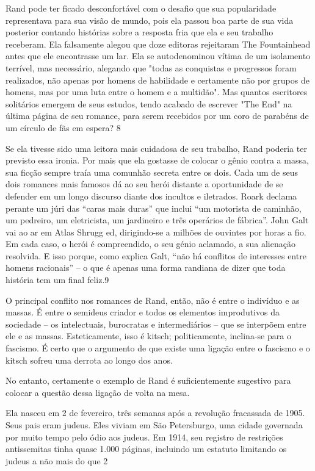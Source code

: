  \par 
Rand pode ter ficado desconfortável com o desafio que sua popularidade representava para sua visão de mundo, pois ela passou boa parte de sua vida posterior contando histórias sobre a resposta fria que ela e seu trabalho receberam. Ela falsamente alegou que doze editoras rejeitaram The Fountainhead antes que ele encontrasse um lar. Ela se autodenominou vítima de um isolamento terrível, mas necessário, alegando que "todas as conquistas e progressos foram realizados, não apenas por homens de habilidade e certamente não por grupos de homens, mas por uma luta entre o homem e a multidão". Mas quantos escritores solitários emergem de seus estudos, tendo acabado de escrever "The End" na última página de seu romance, para serem recebidos por um coro de parabéns de um círculo de fãs em espera? {\color{blue}8}
 \par 
Se ela tivesse sido uma leitora mais cuidadosa de seu trabalho, Rand poderia ter previsto essa ironia. Por mais que ela gostasse de colocar o gênio contra a massa, sua ficção sempre traía uma comunhão secreta entre os dois. Cada um de seus dois romances mais famosos dá ao seu herói distante a oportunidade de se defender em um longo discurso diante dos incultos e iletrados. Roark declama perante um júri das “caras mais duras” que inclui “um motorista de caminhão, um pedreiro, um eletricista, um jardineiro e três operários de fábrica”. John Galt vai ao ar em Atlas Shrugg ed, dirigindo-se a milhões de ouvintes por horas a fio. Em cada caso, o herói é compreendido, o seu génio aclamado, a sua alienação resolvida. E isso porque, como explica Galt, “não há conflitos de interesses entre homens racionais” – o que é apenas uma forma randiana de dizer que toda história tem um final feliz.{\color{blue}9}
 \par 
O principal conflito nos romances de Rand, então, não é entre o indivíduo e as massas. É entre o semideus criador e todos os elementos improdutivos da sociedade – os intelectuais, burocratas e intermediários – que se interpõem entre ele e as massas. Esteticamente, isso é kitsch; politicamente, inclina-se para o fascismo. É certo que o argumento de que existe uma ligação entre o fascismo e o kitsch sofreu uma derrota ao longo dos anos.
 \par 
No entanto, certamente o exemplo de Rand é suficientemente sugestivo para colocar a questão dessa ligação de volta na mesa.
 \par 
Ela nasceu em {\color{blue}2} de fevereiro, três semanas após a revolução fracassada de 1905. Seus pais eram judeus. Eles viviam em São Petersburgo, uma cidade governada por muito tempo pelo ódio aos judeus. Em 1914, seu registro de restrições antissemitas tinha quase {\color{blue}1}.{\color{blue}000} páginas, incluindo um estatuto limitando os judeus a não mais do que 2%
